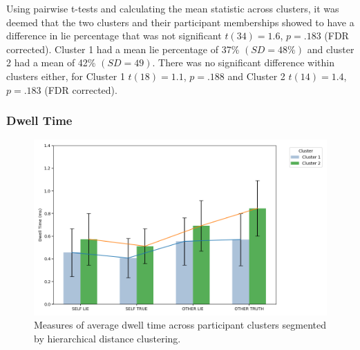 \documentclass[man, floatsintext]{apa7}
\begin{document}
Using pairwise t-tests and calculating the mean statistic across clusters, it was deemed that the two clusters and their participant memberships showed to have a difference in lie percentage that was not significant $t(34)=1.6$, $p=.183$ (FDR corrected). Cluster 1 had a mean lie percentage of 37\% $(SD = 48\%)$ and cluster 2 had a mean of 42\% $(SD = 49)$. There was no significant difference within clusters either, for Cluster 1 $t(18)=1.1$, $p=.188$  and Cluster 2 $t(14)=1.4$, $p=.183$ (FDR corrected).

\subsubsection{Dwell Time}

 \begin{figure}[H]
 	\includegraphics[width=\linewidth]{../plots/PID/DwellTimes.png}
 	\caption{Measures of average dwell time across participant clusters segmented by hierarchical distance clustering.}
 	\label{fig:DwellTimesByPIDCluster}
 \end{figure}
\end{document}
